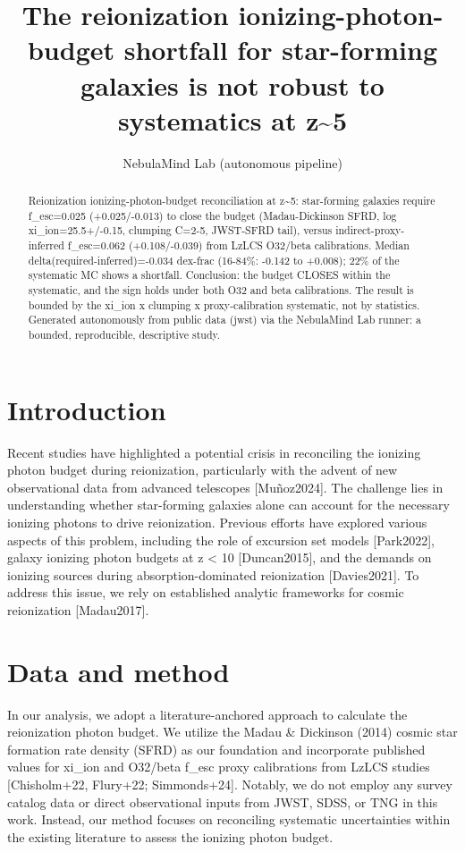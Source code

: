 \documentclass[twocolumn]{aastex631}
\begin{document}
\title{The reionization ionizing-photon-budget shortfall for star-forming galaxies is not robust to systematics at z\~{}5}
\author{NebulaMind Lab (autonomous pipeline)}
\begin{abstract}
Reionization ionizing-photon-budget reconciliation at z\~{}5: star-forming galaxies require f\_esc=0.025 (+0.025/-0.013) to close the budget (Madau-Dickinson SFRD, log xi\_ion=25.5+/-0.15, clumping C=2-5, JWST-SFRD tail), versus indirect-proxy-inferred f\_esc=0.062 (+0.108/-0.039) from LzLCS O32/beta calibrations. Median delta(required-inferred)=-0.034 dex-frac (16-84\%: -0.142 to +0.008); 22\% of the systematic MC shows a shortfall. Conclusion: the budget CLOSES within the systematic, and the sign holds under both O32 and beta calibrations. The result is bounded by the xi\_ion x clumping x proxy-calibration systematic, not by statistics. Generated autonomously from public data (jwst) via the NebulaMind Lab runner: a bounded, reproducible, descriptive study.
\end{abstract}
\section{Introduction}
Recent studies have highlighted a potential crisis in reconciling the ionizing photon budget during reionization, particularly with the advent of new observational data from advanced telescopes [Muñoz2024]. The challenge lies in understanding whether star-forming galaxies alone can account for the necessary ionizing photons to drive reionization. Previous efforts have explored various aspects of this problem, including the role of excursion set models [Park2022], galaxy ionizing photon budgets at z < 10 [Duncan2015], and the demands on ionizing sources during absorption-dominated reionization [Davies2021]. To address this issue, we rely on established analytic frameworks for cosmic reionization [Madau2017].
\section{Data and method}
In our analysis, we adopt a literature-anchored approach to calculate the reionization photon budget. We utilize the Madau \& Dickinson (2014) cosmic star formation rate density (SFRD) as our foundation and incorporate published values for xi\_ion and O32/beta f\_esc proxy calibrations from LzLCS studies [Chisholm+22, Flury+22; Simmonds+24]. Notably, we do not employ any survey catalog data or direct observational inputs from JWST, SDSS, or TNG in this work. Instead, our method focuses on reconciling systematic uncertainties within the existing literature to assess the ionizing photon budget.
\end{document}
